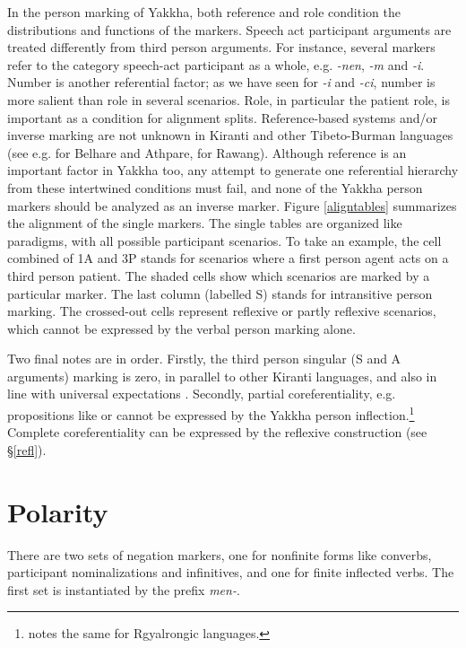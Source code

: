In the person marking of Yakkha, both reference and role condition the distributions and functions of the markers. Speech act participant arguments are treated differently from third person arguments. For instance, several markers refer to the category speech-act participant as a whole, e.g. \emph{-nen}, \emph{-m} and \emph{-i}. Number is another referential factor; as we have seen for \emph{-i} and \emph{-ci}, number is more salient than role in several scenarios. Role, in particular the patient role, is important as a condition for alignment splits. 
Reference-based systems and/or inverse marking are not unknown in Kiranti and other Tibeto-Burman languages  (see e.g. \citet{Ebert1991Inverse} for Belhare and Athpare, \citet{LaPolla2007Hierarchical} for Rawang). Although reference is an important factor in Yakkha too, any attempt to generate one referential hierarchy from these intertwined conditions must  fail, and none of the Yakkha person markers should be analyzed as an inverse marker. Figure \ref{aligntables} summarizes  the alignment of the single markers. The single tables are organized like paradigms, with all possible participant scenarios. To take an example, the cell combined of 1A and 3P stands for scenarios where a first person agent acts on a third person patient. The shaded cells show which  scenarios are marked by a particular marker. The last column (labelled S) stands for intransitive person marking. The crossed-out cells represent reflexive or partly reflexive scenarios, which cannot be expressed by the verbal person marking alone.

Two final notes are in order. Firstly, the third person singular (S and A arguments) marking is zero, in parallel to other Kiranti languages, and also in line with universal expectations \citep{Siewierska2008_Person}. Secondly, partial coreferentiality, e.g. propositions like  or  cannot be expressed by the Yakkha person inflection.\footnote{\citet{Jacques2012_Agreement} notes the same for Rgyalrongic languages.}  Complete coreferentiality can be expressed by the  reflexive construction (see  §\ref{refl}).





\section{Polarity}\label{neg}

There are two sets of negation markers, one for nonfinite forms like converbs, participant nominalizations and infinitives, and one for finite inflected verbs. The first set is instantiated by the prefix \emph{men-}. 

